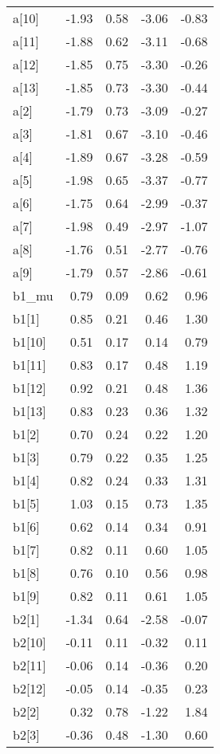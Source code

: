 \documentclass[12pt,]{article}
\begin{document}
\begin{table}[ht]
{\begin{tabular}{lrrrr}
  a[10] & -1.93 & 0.58 & -3.06 & -0.83 \\ 
  a[11] & -1.88 & 0.62 & -3.11 & -0.68 \\ 
  a[12] & -1.85 & 0.75 & -3.30 & -0.26 \\ 
  a[13] & -1.85 & 0.73 & -3.30 & -0.44 \\ 
  a[2] & -1.79 & 0.73 & -3.09 & -0.27 \\ 
  a[3] & -1.81 & 0.67 & -3.10 & -0.46 \\ 
  a[4] & -1.89 & 0.67 & -3.28 & -0.59 \\ 
  a[5] & -1.98 & 0.65 & -3.37 & -0.77 \\ 
  a[6] & -1.75 & 0.64 & -2.99 & -0.37 \\ 
  a[7] & -1.98 & 0.49 & -2.97 & -1.07 \\ 
  a[8] & -1.76 & 0.51 & -2.77 & -0.76 \\ 
  a[9] & -1.79 & 0.57 & -2.86 & -0.61 \\ 
  b1\_mu & 0.79 & 0.09 & 0.62 & 0.96 \\ 
  b1[1] & 0.85 & 0.21 & 0.46 & 1.30 \\ 
  b1[10] & 0.51 & 0.17 & 0.14 & 0.79 \\ 
  b1[11] & 0.83 & 0.17 & 0.48 & 1.19 \\ 
  b1[12] & 0.92 & 0.21 & 0.48 & 1.36 \\ 
  b1[13] & 0.83 & 0.23 & 0.36 & 1.32 \\ 
  b1[2] & 0.70 & 0.24 & 0.22 & 1.20 \\ 
  b1[3] & 0.79 & 0.22 & 0.35 & 1.25 \\ 
  b1[4] & 0.82 & 0.24 & 0.33 & 1.31 \\ 
  b1[5] & 1.03 & 0.15 & 0.73 & 1.35 \\ 
  b1[6] & 0.62 & 0.14 & 0.34 & 0.91 \\ 
  b1[7] & 0.82 & 0.11 & 0.60 & 1.05 \\ 
  b1[8] & 0.76 & 0.10 & 0.56 & 0.98 \\ 
  b1[9] & 0.82 & 0.11 & 0.61 & 1.05 \\ 
  b2[1] & -1.34 & 0.64 & -2.58 & -0.07 \\ 
  b2[10] & -0.11 & 0.11 & -0.32 & 0.11 \\ 
  b2[11] & -0.06 & 0.14 & -0.36 & 0.20 \\ 
  b2[12] & -0.05 & 0.14 & -0.35 & 0.23 \\ 
  b2[2] & 0.32 & 0.78 & -1.22 & 1.84 \\ 
  b2[3] & -0.36 & 0.48 & -1.30 & 0.60 \\ 

\end{tabular}}
\end{table}
\end{document}
